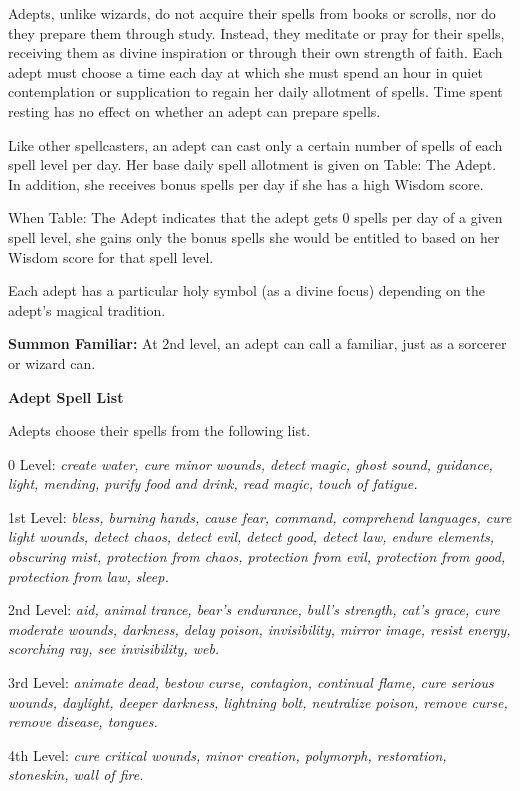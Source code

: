 \documentclass{article}
\begin{document}
Adepts, unlike wizards, do not acquire their spells from books or scrolls, nor 
do they prepare them through study. Instead, they meditate or pray for their spells, 
receiving them as divine inspiration or through their own strength of faith. Each 
adept must choose a time each day at which she must spend an hour in quiet contemplation 
or supplication to regain her daily allotment of spells. Time spent resting has 
no effect on whether an adept can prepare spells.

Like other spellcasters, an adept can cast only a certain number of spells of each 
spell level per day. Her base daily spell allotment is given on Table: The Adept. 
In addition, she receives bonus spells per day if she has a high Wisdom score.

When Table: The Adept indicates that the adept gets 0 spells per day of a given 
spell level, she gains only the bonus spells she would be entitled to based on 
her Wisdom score for that spell level.

Each adept has a particular holy symbol (as a divine focus) depending on the adept's 
magical tradition.

\textbf{Summon Familiar:} At 2nd level, an adept can call a familiar, just as a 
sorcerer or wizard can.

\vspace{12pt}
\textbf{Adept Spell List}

Adepts choose their spells from the following list.

0 Level: \textit{create water, cure minor wounds, detect magic, ghost sound, guidance, 
light, mending, purify food and drink, read magic, touch of fatigue.}

1st Level: \textit{bless, burning hands, cause fear, command, comprehend languages, 
cure light wounds, detect chaos, detect evil, detect good, detect law, endure elements, 
obscuring mist, protection from chaos, protection from evil, protection from good, 
protection from law, sleep.}

2nd Level: \textit{aid, animal trance, bear's endurance, bull's strength, cat's 
grace, cure moderate wounds, darkness, delay poison, invisibility, mirror image, 
resist energy, scorching ray, see invisibility, web.}

3rd Level: \textit{animate dead, bestow curse, contagion, continual flame, cure 
serious wounds, daylight, deeper darkness, lightning bolt, neutralize poison, remove 
curse, remove disease, tongues.}

4th Level: \textit{cure critical wounds, minor creation, polymorph, restoration, 
stoneskin, wall of fire.}
\end{document}
